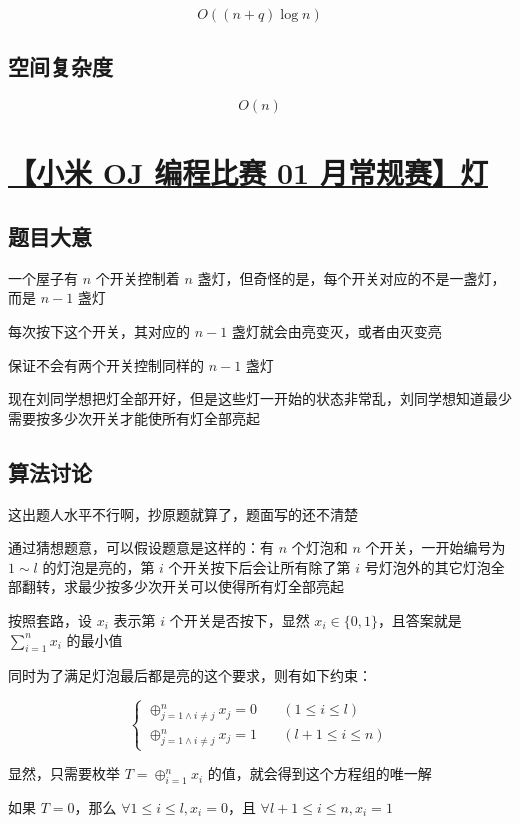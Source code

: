 \documentclass[UTF8]{article}
\begin{document}
$$
O((n+q) \log n)
$$

\subsection{空间复杂度}

$$
O(n)
$$

\section{\href{https://code.mi.com/problem/list/view?id=125}{【小米 OJ 编程比赛 01 月常规赛】灯}}

\subsection{题目大意}

一个屋子有 $n$ 个开关控制着 $n$ 盏灯，但奇怪的是，每个开关对应的不是一盏灯，而是 $n-1$ 盏灯

每次按下这个开关，其对应的 $n-1$ 盏灯就会由亮变灭，或者由灭变亮

保证不会有两个开关控制同样的 $n-1$ 盏灯

现在刘同学想把灯全部开好，但是这些灯一开始的状态非常乱，刘同学想知道最少需要按多少次开关才能使所有灯全部亮起

\subsection{算法讨论}

这出题人水平不行啊，抄原题就算了，题面写的还不清楚

通过猜想题意，可以假设题意是这样的：有 $n$ 个灯泡和 $n$ 个开关，一开始编号为 $1 \sim l$ 的灯泡是亮的，第 $i$ 个开关按下后会让所有除了第 $i$ 号灯泡外的其它灯泡全部翻转，求最少按多少次开关可以使得所有灯全部亮起

按照套路，设 $x_i$ 表示第 $i$ 个开关是否按下，显然 $x_i \in \{0,1\}$，且答案就是 $\sum_{i=1}^{n}x_i$ 的最小值

同时为了满足灯泡最后都是亮的这个要求，则有如下约束：

$$
\begin{cases}
\oplus_{j=1 \wedge i \not= j}^{n}x_j = 0 \quad & (1 \le i \le l) \\
\oplus_{j=1 \wedge i \not= j}^{n}x_j = 1 \quad & (l+1 \le i \le n)
\end{cases}
$$

显然，只需要枚举 $T=\oplus_{i=1}^{n}x_i$ 的值，就会得到这个方程组的唯一解

如果 $T=0$，那么 $\forall 1 \le i \le l,x_i=0$，且 $\forall l+1 \le i \le n,x_i=1$
\end{document}
